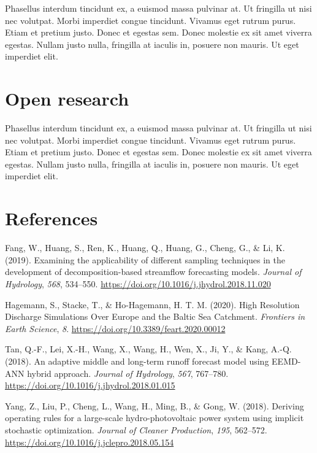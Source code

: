 \documentclass[
]{agujournal2019}
\newlength{\cslhangindent}
\newlength{\cslentryspacingunit} %
\newenvironment{CSLReferences}[2] %
 {%
  \setlength{\parindent}{0pt}
  \ifodd #1
  \let\oldpar\par
  \def\par{\hangindent=\cslhangindent\oldpar}
  \fi
  \setlength{\parskip}{#2\cslentryspacingunit}
 }%
 {}
\begin{document}
Phasellus interdum tincidunt ex, a euismod massa pulvinar at. Ut
fringilla ut nisi nec volutpat. Morbi imperdiet congue tincidunt.
Vivamus eget rutrum purus. Etiam et pretium justo. Donec et egestas sem.
Donec molestie ex sit amet viverra egestas. Nullam justo nulla,
fringilla at iaculis in, posuere non mauris. Ut eget imperdiet elit.

\hypertarget{open-research}{%
\section{Open research}\label{open-research}}

Phasellus interdum tincidunt ex, a euismod massa pulvinar at. Ut
fringilla ut nisi nec volutpat. Morbi imperdiet congue tincidunt.
Vivamus eget rutrum purus. Etiam et pretium justo. Donec et egestas sem.
Donec molestie ex sit amet viverra egestas. Nullam justo nulla,
fringilla at iaculis in, posuere non mauris. Ut eget imperdiet elit.

\hypertarget{references}{%
\section*{References}\label{references}}

\hypertarget{refs}{}
\begin{CSLReferences}{1}{0}
\vspace{1em}

\leavevmode{}%
Fang, W., Huang, S., Ren, K., Huang, Q., Huang, G., Cheng, G., \& Li, K.
(2019). Examining the applicability of different sampling techniques in
the development of decomposition-based streamflow forecasting models.
\emph{Journal of Hydrology}, \emph{568}, 534--550.
\url{https://doi.org/10.1016/j.jhydrol.2018.11.020}

\leavevmode{}%
Hagemann, S., Stacke, T., \& Ho-Hagemann, H. T. M. (2020). High
{Resolution Discharge Simulations Over Europe} and the {Baltic Sea
Catchment}. \emph{Frontiers in Earth Science}, \emph{8}.
\url{https://doi.org/10.3389/feart.2020.00012}

\leavevmode{}%
Tan, Q.-F., Lei, X.-H., Wang, X., Wang, H., Wen, X., Ji, Y., \& Kang,
A.-Q. (2018). An adaptive middle and long-term runoff forecast model
using {EEMD-ANN} hybrid approach. \emph{Journal of Hydrology},
\emph{567}, 767--780.
\url{https://doi.org/10.1016/j.jhydrol.2018.01.015}

\leavevmode{}%
Yang, Z., Liu, P., Cheng, L., Wang, H., Ming, B., \& Gong, W. (2018).
Deriving operating rules for a large-scale hydro-photovoltaic power
system using implicit stochastic optimization. \emph{Journal of Cleaner
Production}, \emph{195}, 562--572.
\url{https://doi.org/10.1016/j.jclepro.2018.05.154}

\end{CSLReferences}
\end{document}
